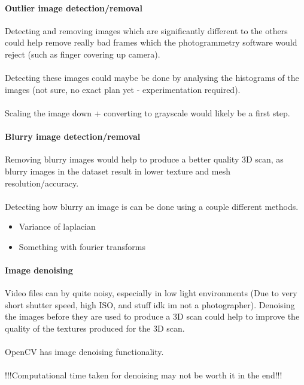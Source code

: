 \documentclass[11pt]{report}
\begin{document}
\paragraph{Outlier image detection/removal}
Detecting and removing images which are significantly different to the others could help remove really bad frames which the photogrammetry software would reject (such as finger covering up camera).\\\\
Detecting these images could maybe be done by analysing the histograms of the images (not sure, no exact plan yet - experimentation required).\\\\
Scaling the image down + converting to grayscale would likely be a first step.

\paragraph{Blurry image detection/removal}
Removing blurry images would help to produce a better quality 3D scan, as blurry images in the dataset result in lower texture and mesh resolution/accuracy.\\\\
Detecting how blurry an image is can be done using a couple different methods.
\begin{itemize}
\item Variance of laplacian
\item Something with fourier transforms
\end{itemize}

\paragraph{Image denoising}
Video files can by quite noisy, especially in low light environments (Due to very short shutter speed, high ISO, and stuff idk im not a photographer). Denoising the images before they are used to produce a 3D scan could help to improve the quality of the textures produced for the 3D scan.\\\\
OpenCV has image denoising functionality.\\\\
!!!Computational time taken for denoising may not be worth it in the end!!!
\end{document}
